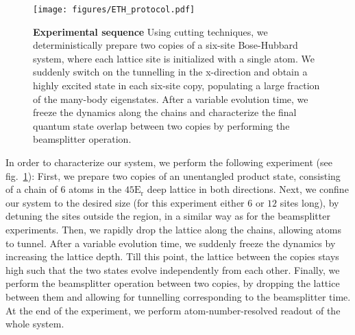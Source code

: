 
\begin{figure}[t]
	\centering
	\texttt{[image: figures/ETH\_protocol.pdf]}
	\caption{{\bf Experimental sequence} Using cutting techniques, we deterministically prepare two copies of a six-site Bose-Hubbard system, where each lattice site is initialized with a single atom. We suddenly switch on the tunnelling in the x-direction and obtain a highly excited state in each six-site copy, populating a large fraction of the many-body eigenstates. After a variable evolution time, we freeze the dynamics along the chains and characterize the final quantum state overlap between two copies by performing the beamsplitter operation.}
	
	\label{fig:CBH_purity_protocol}
\end{figure} 

In order to characterize our system, we perform the following experiment (see fig.~\ref{fig:CBH_purity_protocol}): First, we prepare two copies of an unentangled product state, consisting of a chain of $6$ atoms in the $45\mathrm{E_r}$ deep lattice in both directions. Next, we confine our system to the desired size (for this experiment either $6$ or $12$ sites long), by detuning the sites outside the region, in a similar way as for the beamsplitter experiments. Then, we rapidly drop the lattice along the chains, allowing atoms to tunnel. After a variable evolution time, we suddenly freeze the dynamics by increasing the lattice depth. Till this point, the lattice between the copies stays high such that the two states evolve independently from each other. Finally, we perform the beamsplitter operation between two copies, by dropping the lattice between them and allowing for tunnelling corresponding to the beamsplitter time. At the end of the experiment, we perform atom-number-resolved readout of the whole system.

